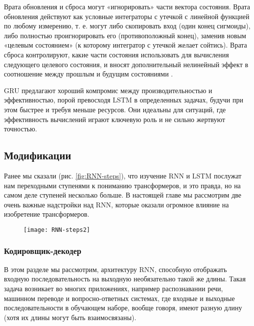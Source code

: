 Врата обновления и сброса могут «игнорировать» части вектора состояния. 
Врата обновления действуют как условные интеграторы с утечкой с линейной
функцией по любому измерению, т. е. могут либо скопировать вход (один конец 
сигмоиды), либо полностью проигнорировать его (противоположный конец), заменив
новым «целевым состоянием» (к которому интегратор с утечкой желает сойтись).
Врата сброса контролируют, какие части состояния использовать для вычисления 
следующего целевого состояния, и вносят дополнительный нелинейный эффект в 
соотношение между прошлым и будущим состояниями \cite{Goodfellow-et-al-2016}.

GRU предлагают хороший компромис между производительностью и эффективностью, 
порой превосходя LSTM в определенных задачах, будучи при этом быстрее и 
требуя меньше ресурсов. Они идеальны для ситуаций, где эффективность 
вычислений играют ключевую роль и не сильно жертвуют точностью.

\subsection{Модификации}

Ранее мы сказали (рис. \ref{fig:RNN-steps}), что изучение RNN и LSTM послужат нам 
переходными ступенями к пониманию трансформеров, и это правда, но на самом деле 
ступеней несколько больше. В настоящей главе мы рассмотрим две очень важные надстройки 
над RNN, которые оказали огромное влияние на изобретение трансформеров.

\begin{figure}[h!]
    \centering
    \texttt{[image: RNN-steps2]}
    \caption{\cite{statquest_ml_series}}
    \label{fig:RNN-steps2}
\end{figure}


\subsubsection{Кодировщик-декодер}

В этом разделе мы рассмотрим, архитектуру RNN, способную отображать входную 
последовательность на выходную необязательно такой же длины. 
Такая задача возникает во многих
приложениях, например распознавании речи, машинном переводе и 
вопросно-ответных системах, где входные и выходные последовательности в 
обучающем наборе, вообще говоря, имеют разную длину 
(хотя их длины могут быть взаимосвязаны).

